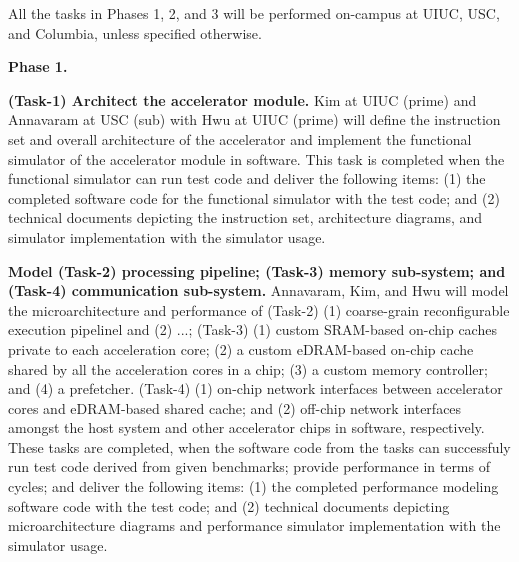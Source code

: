 
\noindent
All the tasks in Phases 1, 2, and 3 will be performed on-campus at UIUC, USC, and Columbia, unless specified otherwise.

\noindent
\textbf{Phase 1.}

\noindent
\textbf{(Task-1) Architect the accelerator module.} 
Kim at UIUC (prime) and Annavaram at USC (sub) with Hwu at UIUC (prime) will define the instruction set and overall architecture of the accelerator and implement the functional simulator of the accelerator module in software.
This task is completed when the functional simulator can run test code and deliver the following items: 
(1) the completed software code for the functional simulator with the test code; and (2) technical documents depicting the instruction set, architecture diagrams, and simulator implementation with the simulator usage.


\noindent
\textbf{Model (Task-2) processing pipeline; (Task-3) memory sub-system; and (Task-4) communication sub-system.}
Annavaram, Kim, and Hwu will model the microarchitecture and performance of 
(Task-2) (1) coarse-grain reconfigurable execution pipelinel and (2) ...;
(Task-3) (1) custom SRAM-based on-chip caches private to each acceleration core; (2) a custom eDRAM-based on-chip cache shared by all the acceleration cores in a chip; (3) a custom memory controller; and (4) a prefetcher.
(Task-4) (1) on-chip network interfaces between accelerator cores and eDRAM-based shared cache; and (2) off-chip network interfaces amongst the host system and other accelerator chips in software, respectively.
These tasks are completed, when the software code from the tasks can successfuly run test code derived from given benchmarks; provide performance in terms of cycles; and deliver the following items:
(1) the completed performance modeling software code with the test code; and (2) technical documents depicting microarchitecture diagrams and performance simulator implementation with the simulator usage.


